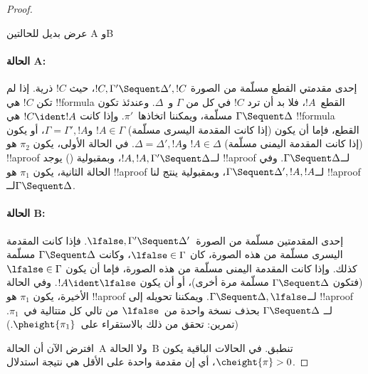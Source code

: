 \documentclass[../../../include/open-logic-section]{subfiles}
\begin{document}
\begin{proof}
\begin{center}
عرض بديل للحالتين A وB
\end{center}

\paragraph{الحالة A:} إحدى مقدمتي القطع مسلّمة من الصورة $!C, \Gamma'
\Sequent \Delta', !C$، حيث $!C$ ذرية. إذا لم تكن $!C$ هي !!{formula}
القطع~$!A$، فلا بد أن ترد $!C$ في كل من $\Gamma$ و~$\Delta$. وعندئذ تكون
$\Gamma \Sequent \Delta$ مسلّمة، ويمكننا اتخاذها~$\pi'$. وإذا كانت
$!C\ident !A$ هي !!{formula} القطع، فإما أن يكون (إذا كانت المقدمة اليسرى
مسلّمة) $!A\in\Gamma$ و$\Gamma=\Gamma', !A$، أو يكون (إذا كانت المقدمة
اليمنى مسلّمة) $!A\in\Delta$ و$\Delta=\Delta', !A$. في الحالة الأولى،
يكون $\pi_2$ هو !!a{proof} لــ$!A, !A, \Gamma' \Sequent \Delta$، وبمقبولية
\LeftR{\Contraction} () يوجد !!a{proof}
لــ$\Gamma \Sequent \Delta$. وفي الحالة الثانية، يكون $\pi_1$ هو
!!a{proof} لــ$\Gamma \Sequent \Delta', !A, !A$، وبمقبولية
\RightR{\Contraction} ينتج لنا !!a{proof} لــ$\Gamma \Sequent \Delta$.

\paragraph{الحالة B:} إحدى المقدمتين مسلّمة من الصورة~$\lfalse,
\Gamma' \Sequent \Delta'$. فإذا كانت المقدمة اليسرى مسلّمة من هذه الصورة،
كان $\lfalse\in\Gamma$، وكانت $\Gamma \Sequent \Delta$ مسلّمة كذلك.
وإذا كانت المقدمة اليمنى مسلّمة من هذه الصورة، فإما أن يكون
$\lfalse\in\Gamma$ (فتكون $\Gamma \Sequent \Delta$ مسلّمة مرة أخرى)، أو
أن يكون $!A\ident\lfalse$. وفي الحالة الأخيرة، يكون $\pi_1$ هو !!a{proof}
لــ$\Gamma \Sequent \Delta, \lfalse$. ويمكننا تحويله إلى !!a{proof} لــ
$\Gamma \Sequent \Delta$ بحذف نسخة واحدة من~$\lfalse$ من تالي كل متتالية
في~$\pi_1$. (تمرين: تحقق من ذلك بالاستقراء على~$\pheight{\pi_1}$.)

افترض الآن أن الحالة~A ولا الحالة~B تنطبق. في الحالات الباقية يكون
$\cheight{\pi}>0$، أي إن مقدمة واحدة على الأقل هي نتيجة استدلال.


\end{proof}
\end{document}
